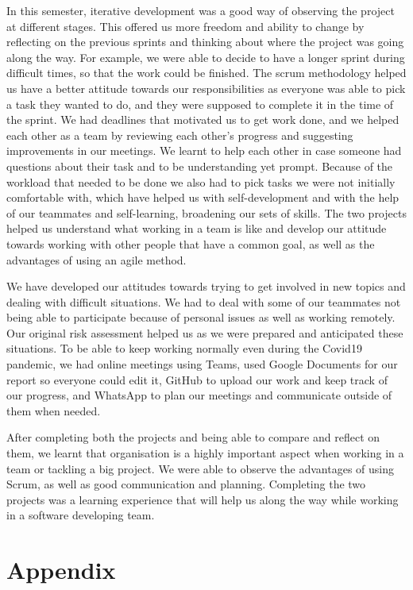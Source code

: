 \documentclass[10pt, notitlepage]{report}
\begin{document}
In this semester, iterative development was a good way of observing the project at different stages. This offered us more freedom and ability to change by reflecting on the previous sprints and thinking about where the project was going along the way. For example, we were able to decide to have a longer sprint during difficult times, so that the work could be finished. The scrum methodology helped us have a better attitude towards our responsibilities as everyone was able to pick a task they wanted to do, and they were supposed to complete it in the time of the sprint. We had deadlines that motivated us to get work done, and we helped each other as a team by reviewing each other’s progress and suggesting improvements in our meetings. 
We learnt to help each other in case someone had questions about their task and to be understanding yet prompt. Because of the workload that needed to be done we also had to pick tasks we were not initially comfortable with, which have helped us with self-development and with the help of our teammates and self-learning, broadening our sets of skills. The two projects helped us understand what working in a team is like and develop our attitude towards working with other people that have a common goal, as well as the advantages of using an agile method. 

We have developed our attitudes towards trying to get involved in new topics and dealing with difficult situations. We had to deal with some of our teammates not being able to participate because of personal issues as well as working remotely. Our original risk assessment helped us as we were prepared and anticipated these situations. To be able to keep working normally even during the Covid19 pandemic, we had online meetings using Teams, used Google Documents for our report so everyone could edit it, GitHub to upload our work and keep track of our progress, and WhatsApp to plan our meetings and communicate outside of them when needed. 

After completing both the projects and being able to compare and reflect on them, we learnt that organisation is a highly important aspect when working in a team or tackling a big project. We were able to observe the advantages of using Scrum, as well as good communication and planning. Completing the two projects was a learning experience that will help us along the way while working in a software developing team.

{}


\chapter{Appendix}
\end{document}
